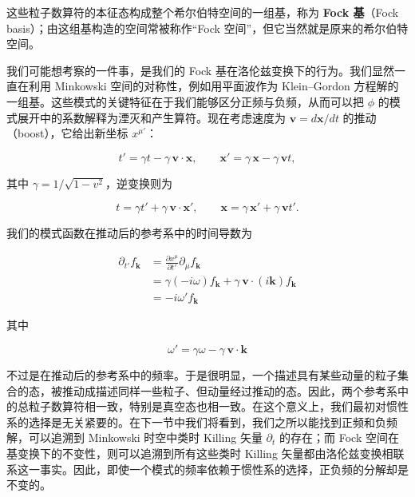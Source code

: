 这些粒子数算符的本征态构成整个希尔伯特空间的一组基，称为 \textbf{Fock 基}（Fock basis）；由这组基构造的空间常被称作“Fock 空间”，但它当然就是原来的希尔伯特空间。

我们可能想考察的一件事，是我们的 Fock 基在洛伦兹变换下的行为。我们显然一直在利用 Minkowski 空间的对称性，例如用平面波作为 Klein--Gordon 方程解的一组基。这些模式的关键特征在于我们能够区分正频与负频，从而可以把 $\phi$ 的模式展开中的系数解释为湮灭和产生算符。现在考虑速度为 $\mathbf{v} = d\mathbf{x}/dt$ 的推动（boost），它给出新坐标 $x^{\mu'}$：

\begin{equation*}
t' = \gamma t - \gamma\,\mathbf{v}\cdot\mathbf{x}, \qquad \mathbf{x}' = \gamma\,\mathbf{x} - \gamma\,\mathbf{v}t,
\tag{9.74}
\end{equation*}

其中 $\gamma = 1/\sqrt{1-v^2}$，逆变换则为

\begin{equation*}
t = \gamma t' + \gamma\,\mathbf{v}\cdot\mathbf{x}', \qquad \mathbf{x} = \gamma\,\mathbf{x}' + \gamma\,\mathbf{v}t'.
\tag{9.75}
\end{equation*}

我们的模式函数在推动后的参考系中的时间导数为

\begin{align*}
\partial_{t'}f_{\mathbf{k}} &= \frac{\partial x^{\mu}}{\partial t'}\partial_{\mu}f_{\mathbf{k}} \\
&= \gamma(-i\omega)f_{\mathbf{k}} + \gamma\,\mathbf{v}\cdot(i\mathbf{k})f_{\mathbf{k}} \\
&= -i\omega' f_{\mathbf{k}}
\tag{9.76}
\end{align*}

其中

\begin{equation*}
\omega' = \gamma\omega - \gamma\,\mathbf{v}\cdot\mathbf{k}
\tag{9.77}
\end{equation*}

不过是在推动后的参考系中的频率。于是很明显，一个描述具有某些动量的粒子集合的态，被推动成描述同样一些粒子、但动量经过推动的态。因此，两个参考系中的总粒子数算符相一致，特别是真空态也相一致。在这个意义上，我们最初对惯性系的选择是无关紧要的。在下一节中我们将看到，我们之所以能找到正频和负频解，可以追溯到 Minkowski 时空中类时 Killing 矢量 $\partial_t$ 的存在；而 Fock 空间在基变换下的不变性，则可以追溯到所有这些类时 Killing 矢量都由洛伦兹变换相联系这一事实。因此，即使一个模式的频率依赖于惯性系的选择，正负频的分解却是不变的。

